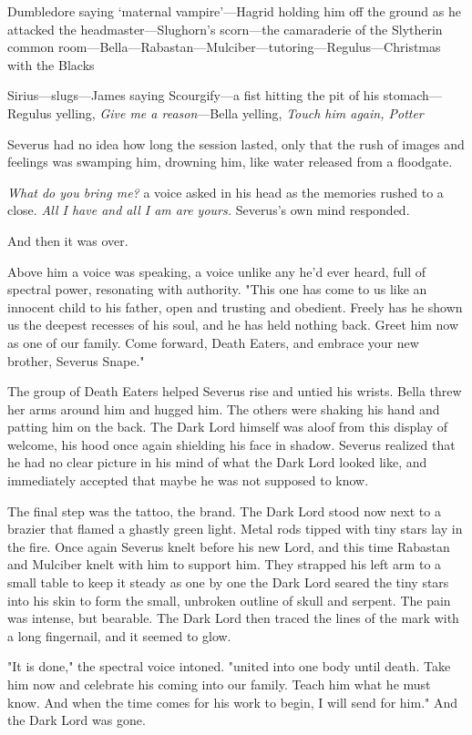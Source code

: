 Dumbledore saying `maternal vampire'—Hagrid holding him off the ground as he attacked the headmaster—Slughorn's scorn—the camaraderie of the Slytherin common room—Bella—Rabastan—Mulciber—tutoring—Regulus—Christmas with the Blacks{\el}

Sirius—slugs—James saying Scourgify—a fist hitting the pit of his stomach—Regulus yelling, \emph{Give me a reason}—Bella yelling, \emph{Touch him again, Potter}{\el}

Severus had no idea how long the session lasted, only that the rush of images and feelings was swamping him, drowning him, like water released from a floodgate.

\emph{What do you bring me?} a voice asked in his head as the memories rushed to a close. \emph{All I have and all I am are yours.} Severus's own mind responded.

And then it was over.

Above him a voice was speaking, a voice unlike any he'd ever heard, full of spectral power, resonating with authority. "This one has come to us like an innocent child to his father, open and trusting and obedient. Freely has he shown us the deepest recesses of his soul, and he has held nothing back. Greet him now as one of our family. Come forward, Death Eaters, and embrace your new brother, Severus Snape."

The group of Death Eaters helped Severus rise and untied his wrists. Bella threw her arms around him and hugged him. The others were shaking his hand and patting him on the back. The Dark Lord himself was aloof from this display of welcome, his hood once again shielding his face in shadow. Severus realized that he had no clear picture in his mind of what the Dark Lord looked like, and immediately accepted that maybe he was not supposed to know.

The final step was the tattoo, the brand. The Dark Lord stood now next to a brazier that flamed a ghastly green light. Metal rods tipped with tiny stars lay in the fire. Once again Severus knelt before his new Lord, and this time Rabastan and Mulciber knelt with him to support him. They strapped his left arm to a small table to keep it steady as one by one the Dark Lord seared the tiny stars into his skin to form the small, unbroken outline of skull and serpent. The pain was intense, but bearable. The Dark Lord then traced the lines of the mark with a long fingernail, and it seemed to glow.

"It is done," the spectral voice intoned. "united into one body until death. Take him now and celebrate his coming into our family. Teach him what he must know. And when the time comes for his work to begin, I will send for him." And the Dark Lord was gone.

